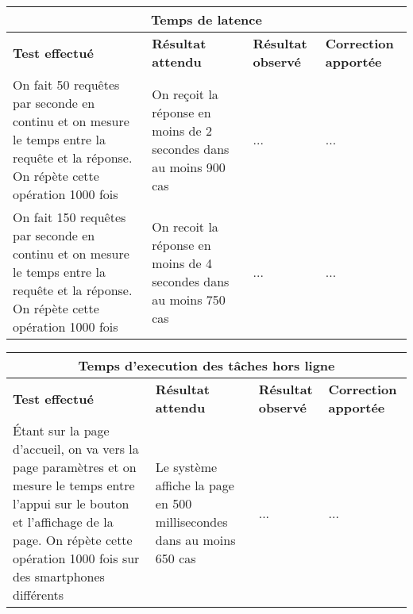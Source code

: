 \documentclass{article}
\begin{document}
  \begin{center}
    \begin{tabular}{|p{4cm}|p{4cm}|p{4cm}|p{4cm}|}
      \hline
      \multicolumn{4}{|c|}{\textbf{Temps de latence}} \\
      \hline
      \textbf{Test effectué} & \textbf{Résultat attendu} & \textbf{Résultat observé} & \textbf{Correction apportée} \\
      \hline

      On fait 50 requêtes par seconde en continu et on mesure le temps entre la requête et la réponse. On répète cette opération 1000 fois&
      On reçoit la réponse en moins de 2 secondes dans au moins 900 cas&
      ...&
      ... \\

      \hline
      \hline
      On fait 150 requêtes par seconde en continu et on mesure le temps entre la requête et la réponse. On répète cette opération 1000 fois&
      On recoit la réponse en moins de 4 secondes dans au moins 750 cas&
      ...&
      ... \\

      \hline

    \end{tabular}
  \end{center}

  \begin{center}
    \begin{tabular}{|p{4cm}|p{4cm}|p{4cm}|p{4cm}|}
      \hline
      \multicolumn{4}{|c|}{\textbf{Temps d’execution des tâches hors ligne}} \\
      \hline
      \textbf{Test effectué} & \textbf{Résultat attendu} & \textbf{Résultat observé} & \textbf{Correction apportée} \\
      \hline


      Étant sur la page d'accueil, on va vers la page paramètres et on mesure le temps entre l'appui sur le bouton et l'affichage de la page. On répète cette opération 1000 fois sur des smartphones différents&
      Le système affiche la page en 500 millisecondes dans au moins 650 cas&
      ...&
      ... \\


      \hline

    \end{tabular}
  \end{center}
\end{document}
